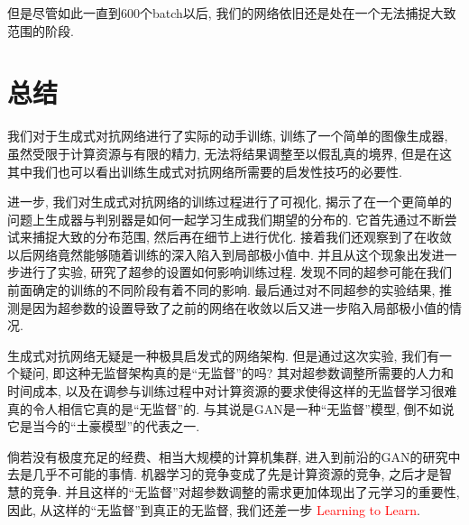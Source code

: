 \documentclass[lang=cn,11pt]{elegantpaper}
\begin{document}
但是尽管如此一直到600个batch以后, 我们的网络依旧还是处在一个无法捕捉大致范围的阶段.

\section{总结}

我们对于生成式对抗网络进行了实际的动手训练, 训练了一个简单的图像生成器, 虽然受限于计算资源与有限的精力, 无法将结果调整至以假乱真的境界, 但是在这其中我们也可以看出训练生成式对抗网络所需要的启发性技巧的必要性. 

进一步, 我们对生成式对抗网络的训练过程进行了可视化, 揭示了在一个更简单的问题上生成器与判别器是如何一起学习生成我们期望的分布的. 它首先通过不断尝试来捕捉大致的分布范围, 然后再在细节上进行优化. 接着我们还观察到了在收敛以后网络竟然能够随着训练的深入陷入到局部极小值中. 并且从这个现象出发进一步进行了实验, 研究了超参的设置如何影响训练过程. 发现不同的超参可能在我们前面确定的训练的不同阶段有着不同的影响. 最后通过对不同超参的实验结果, 推测是因为超参数的设置导致了之前的网络在收敛以后又进一步陷入局部极小值的情况. 

生成式对抗网络无疑是一种极具启发式的网络架构. 但是通过这次实验, 我们有一个疑问, 即这种无监督架构真的是“无监督”的吗? 其对超参数调整所需要的人力和时间成本, 以及在调参与训练过程中对计算资源的要求使得这样的无监督学习很难真的令人相信它真的是“无监督”的. 与其说是GAN是一种“无监督”模型, 倒不如说它是当今的“土豪模型”的代表之一. 

倘若没有极度充足的经费、相当大规模的计算机集群, 进入到前沿的GAN的研究中去是几乎不可能的事情. 机器学习的竞争变成了先是计算资源的竞争, 之后才是智慧的竞争. 并且这样的“无监督”对超参数调整的需求更加体现出了元学习的重要性, 因此, 从这样的“无监督”到真正的无监督, 我们还差一步 \textcolor{red}{Learning to Learn}.


\newpage
\nocite{*}



\end{document}
